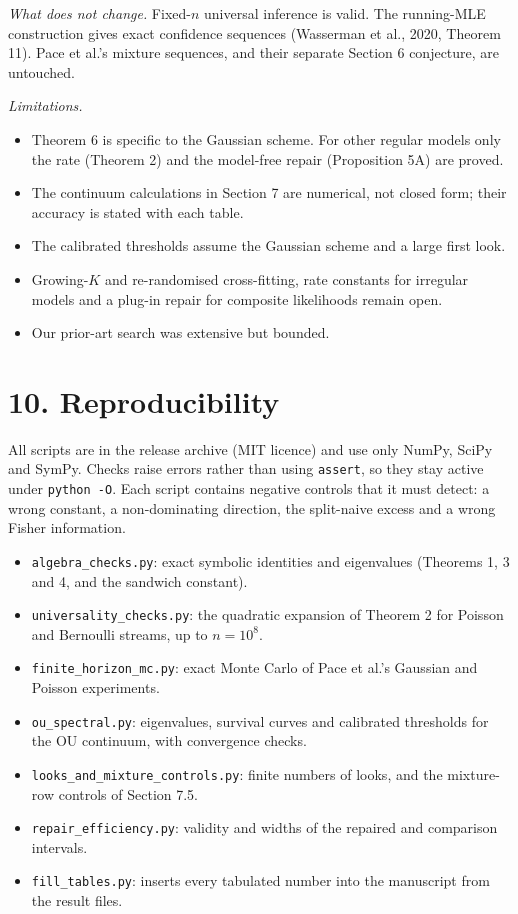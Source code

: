 \documentclass[
  10pt,
  a4paper,
]{article}
\providecommand{\tightlist}{%
  \setlength{\itemsep}{0pt}\setlength{\parskip}{0pt}}
\begin{document}
\emph{What does not change.} Fixed-\(n\) universal inference is valid.
The running-MLE construction gives exact confidence sequences (Wasserman
et al., 2020, Theorem 11). Pace et al.'s mixture sequences, and their
separate Section 6 conjecture, are untouched.

\emph{Limitations.}

\begin{itemize}
\tightlist
\item
  Theorem 6 is specific to the Gaussian scheme. For other regular models
  only the rate (Theorem 2) and the model-free repair (Proposition 5A)
  are proved.
\item
  The continuum calculations in Section 7 are numerical, not closed
  form; their accuracy is stated with each table.
\item
  The calibrated thresholds assume the Gaussian scheme and a large first
  look.
\item
  Growing-\(K\) and re-randomised cross-fitting, rate constants for
  irregular models and a plug-in repair for composite likelihoods remain
  open.
\item
  Our prior-art search was extensive but bounded.
\end{itemize}

\section{10. Reproducibility}\label{reproducibility}

All scripts are in the release archive (MIT licence) and use only NumPy,
SciPy and SymPy. Checks raise errors rather than using \texttt{assert},
so they stay active under \texttt{python\ -O}. Each script contains
negative controls that it must detect: a wrong constant, a
non-dominating direction, the split-naive excess and a wrong Fisher
information.

\begin{itemize}
\tightlist
\item
  \texttt{algebra\_checks.py}: exact symbolic identities and eigenvalues
  (Theorems 1, 3 and 4, and the sandwich constant).
\item
  \texttt{universality\_checks.py}: the quadratic expansion of Theorem 2
  for Poisson and Bernoulli streams, up to \(n=10^8\).
\item
  \texttt{finite\_horizon\_mc.py}: exact Monte Carlo of Pace et al.'s
  Gaussian and Poisson experiments.
\item
  \texttt{ou\_spectral.py}: eigenvalues, survival curves and calibrated
  thresholds for the OU continuum, with convergence checks.
\item
  \texttt{looks\_and\_mixture\_controls.py}: finite numbers of looks,
  and the mixture-row controls of Section 7.5.
\item
  \texttt{repair\_efficiency.py}: validity and widths of the repaired
  and comparison intervals.
\item
  \texttt{fill\_tables.py}: inserts every tabulated number into the
  manuscript from the result files.
\end{itemize}
\end{document}
